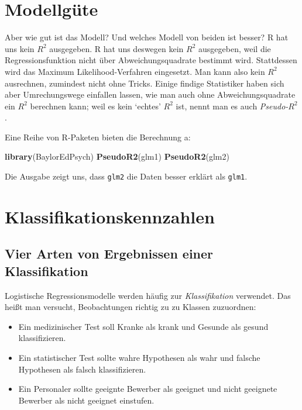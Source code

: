 \documentclass[12pt,ngerman,]{book}
\makeatletter
\newenvironment{Shaded}{\begin{snugshade}}{\end{snugshade}}
\newcommand{\KeywordTok}[1]{\textcolor[rgb]{0.13,0.29,0.53}{\textbf{{#1}}}}
\newcommand{\NormalTok}[1]{{#1}}
\providecommand{\tightlist}{%
  \setlength{\itemsep}{0pt}\setlength{\parskip}{0pt}}
\newenvironment{kframe}{%
\medskip{}
\setlength{\fboxsep}{.8em}
 \def\at@end@of@kframe{}%
 \ifinner\ifhmode%
  \def\at@end@of@kframe{\end{minipage}}%
  \begin{minipage}{\columnwidth}%
 \fi\fi%
 \def\FrameCommand##1{\hskip\@totalleftmargin \hskip-\fboxsep
 \colorbox{shadecolor}{##1}\hskip-\fboxsep
     \hskip-\linewidth \hskip-\@totalleftmargin \hskip\columnwidth}%
 \MakeFramed {\advance\hsize-\width
   \@totalleftmargin\z@ \linewidth\hsize
   \@setminipage}}%
 {\par\unskip\endMakeFramed%
 \at@end@of@kframe}
\renewenvironment{Shaded}{\begin{kframe}}{\end{kframe}}
\theoremstyle{definition}
\theoremstyle{definition}
\theoremstyle{remark}
\makeatother
\begin{document}
\section{Modellgüte}\label{modellgute-1}

Aber wie gut ist das Modell? Und welches Modell von beiden ist besser? R
hat uns kein \(R^2\) ausgegeben. R hat uns deswegen kein \(R^2\)
ausgegeben, weil die Regressionsfunktion nicht über Abweichungsquadrate
bestimmt wird. Stattdessen wird das Maximum Likelihood-Verfahren
eingesetzt. Man kann also kein \(R^2\) ausrechnen, zumindest nicht ohne
Tricks. Einige findige Statistiker haben sich aber Umrechungswege
einfallen lassen, wie man auch ohne Abweichungsquadrate ein \(R^2\)
berechnen kann; weil es kein `echtes' \(R^2\) ist, nennt man es auch
\emph{Pseudo-}\(R^2\).

Eine Reihe von R-Paketen bieten die Berechnung a:

\begin{Shaded}
\begin{Highlighting}[]
\KeywordTok{library}\NormalTok{(BaylorEdPsych)}
\KeywordTok{PseudoR2}\NormalTok{(glm1)}
\KeywordTok{PseudoR2}\NormalTok{(glm2)}
\end{Highlighting}
\end{Shaded}

Die Ausgabe zeigt uns, dass \texttt{glm2} die Daten besser erklärt als
\texttt{glm1}.

\section{Klassifikationskennzahlen}\label{klassifikationskennzahlen}

\subsection{Vier Arten von Ergebnissen einer
Klassifikation}\label{vier-arten-von-ergebnissen-einer-klassifikation}

Logistische Regressionsmodelle werden häufig zur
\emph{Klassifikation} verwendet. Das heißt man
versucht, Beobachtungen richtig zu zu Klassen zuzuordnen:

\begin{itemize}
\tightlist
\item
  Ein medizinischer Test soll Kranke als krank und Gesunde als gesund
  klassifizieren.
\item
  Ein statistischer Test sollte wahre Hypothesen als wahr und falsche
  Hypothesen als falsch klassifizieren.
\item
  Ein Personaler sollte geeignte Bewerber als geeignet und nicht
  geeignete Bewerber als nicht geeignet einstufen.
\end{itemize}
\end{document}
